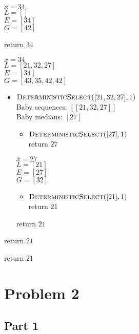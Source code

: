 \documentclass{article}
\begin{document}
\begin{itemize}
\begin{itemize}
\begin{itemize}
            $x = 34$ \\
            $L = []$ \\
            $E = [34]$ \\
            $G = [42]$
            
            return $34$
        \end{itemize}

        $x = 34$ \\
        $L = [21, 32, 27]$ \\
        $E = [34]$ \\
        $G = [43, 35, 42, 42]$

        \begin{itemize}
            \item $\textproc{DeterministicSelect}([21, 32, 27],1)$ \\
            Baby sequences: $[[21, 32, 27]]$ \\
            Baby medians: $[27]$
            \begin{itemize}
                \item $\textproc{DeterministicSelect}([27],1)$ \\
                return $27$
            \end{itemize}

            $x = 27$ \\
            $L = [21]$ \\
            $E = [27]$ \\
            $G = [32]$

            \begin{itemize}
                \item $\textproc{DeterministicSelect}([21], 1)$ \\
                return $21$
            \end{itemize}
            return $21$           
        \end{itemize}
        
        return $21$
    \end{itemize}

    return $21$
\end{itemize}


\pagebreak
\section{Problem 2}

\subsection{Part 1}
\end{document}
